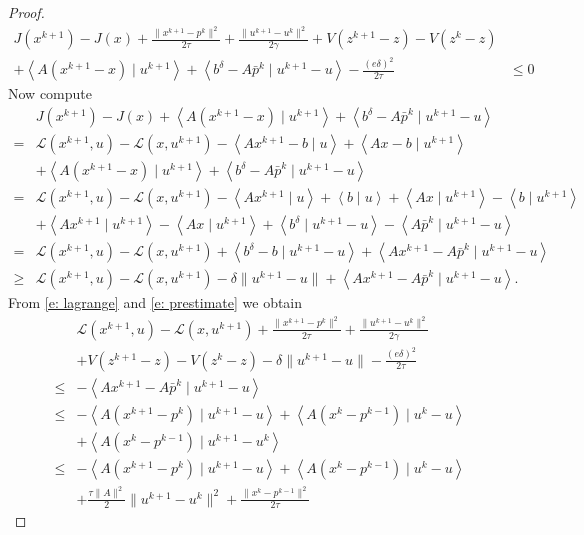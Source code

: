 \documentclass[11pt]{report}
\newcommand{\scal}[2]{{\left\langle{{#1}\mid{#2}}\right\rangle}}
\theoremstyle{plain}{\theorembodyfont{\rmfamily}%
\newtheorem{assumption}[theorem]{Assumption}}
\theoremstyle{plain}{\theorembodyfont{\rmfamily}%
\newtheorem{algorithm}[theorem]{Algorithm}}
\theoremstyle{plain}{\theorembodyfont{\rmfamily}%
\newtheorem{example}[theorem]{Example}}
\theoremstyle{plain}{\theorembodyfont{\rmfamily}%
\newtheorem{remark}[theorem]{Remark}}
\theoremstyle{plain}{\theorembodyfont{\rmfamily}%
\newtheorem{definition}[theorem]{Definition}}
\theoremstyle{plain}{\theorembodyfont{\rmfamily}%
\newtheorem{problem}[theorem]{Problem}}
\numberwithin{equation}{chapter}
\newcommand{\dal}{u}
\newcommand{\prim}{x}
\newcommand{\proj}{p}
\begin{document}
\begin{proof}
\begin{align}
         J(\prim^{k+1})-J(\prim)+\frac{\|\prim^{k+1}-\proj^k\|^2}{2\tau} +\frac{\|\dal^{k+1}-\dal^{k}\|^2}{2\gamma}+V(z^{k+1}-z)-V(z^{k}-z)&\nonumber\\+\scal{A(\prim^{k+1}-\prim)}{\dal^{k+1}} +\scal{b^{\delta}-A\bar{\proj}^k}{\dal^{k+1}-\dal}-\frac{\left(e\delta\right)^2}{2\tau}&\leq 0\label{e: prestimate}
    \end{align}
    Now compute 
    \begin{align}
        & J(\prim^{k+1})-J(\prim)+\scal{A(\prim^{k+1}-\prim)}{\dal^{k+1}} +\scal{b^{\delta}-A\bar{\proj}^k}{\dal^{k+1}-\dal}\nonumber\\ =&\mathcal{L}(\prim^{k+1},\dal)-\mathcal{L}(\prim,\dal^{k+1})-\scal{A\prim^{k+1}-b}{\dal}+\scal{A\prim-b}{\dal^{k+1}}\nonumber\\&+\scal{A(\prim^{k+1}-\prim)}{\dal^{k+1}} +\scal{b^{\delta}-A\bar{\proj}^k}{\dal^{k+1}-\dal}\nonumber\\ =&\mathcal{L}(\prim^{k+1},\dal)-\mathcal{L}(\prim,\dal^{k+1})-\scal{A\prim^{k+1}}{\dal}+\scal{b}{\dal}+\scal{A\prim}{\dal^{k+1}}-\scal{b}{\dal^{k+1}}\nonumber\\&+\scal{A\prim^{k+1}}{\dal^{k+1}}-\scal{A\prim}{\dal^{k+1}} +\scal{b^\delta}{\dal^{k+1}-\dal}-\scal{A\bar{\proj}^k}{\dal^{k+1}-\dal}\nonumber\\ =&\mathcal{L}(\prim^{k+1},\dal)-\mathcal{L}(\prim,\dal^{k+1})+\scal{b^{\delta}-b}{\dal^{k+1}-\dal} +\scal{A\prim^{k+1}-A\bar{\proj}^k}{\dal^{k+1}-\dal}\nonumber\\ \geq&\mathcal{L}(\prim^{k+1},\dal)-\mathcal{L}(\prim,\dal^{k+1})-\delta\|\dal^{k+1}-\dal\| +\scal{A\prim^{k+1}-A\bar{\proj}^k}{\dal^{k+1}-\dal}.
        \label{e: lagrange}
    \end{align}
   From \eqref{e: lagrange} and \eqref{e: prestimate} we obtain
\begin{align}
        &\mathcal{L}(\prim^{k+1},\dal)-\mathcal{L}(\prim,\dal^{k+1})+\frac{\|\prim^{k+1}-\proj^k\|^2}{2\tau} +\frac{\|\dal^{k+1}-\dal^{k}\|^2}{2\gamma}\nonumber\\&+V(z^{k+1}-z)-V(z^{k}-z)-\delta\|\dal^{k+1}-\dal\|-\frac{\left(e\delta\right)^2}{2\tau}\nonumber\\ \leq& -\scal{A\prim^{k+1}-A\bar{\proj}^k}{\dal^{k+1}-\dal} \nonumber\\ \leq& -\scal{A(\prim^{k+1}-\proj^{k})}{\dal^{k+1}-\dal}+\scal{A(\prim^{k}-\proj^{k-1})}{\dal^{k}-\dal} \nonumber\\ &+\scal{A(\prim^{k}-\proj^{k-1})}{\dal^{k+1}-\dal^k}\label{e: lagrangeI.5}\\  \leq& -\scal{A(\prim^{k+1}-\proj^{k})}{\dal^{k+1}-\dal}+\scal{A(\prim^{k}-\proj^{k-1})}{\dal^{k}-\dal} \nonumber\\ &+\frac{\tau\|A\|^2}{2}\|\dal^{k+1}-\dal^k\|^2+\frac{\|\prim^{k}-\proj^{k-1}\|^2}{2\tau}\label{e: lagrangeI}

\end{align}
\end{proof}
\end{document}
